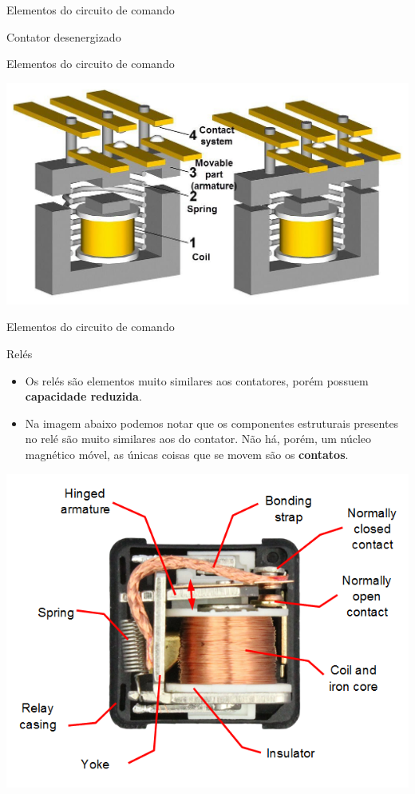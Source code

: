 \begin{frame}{Elementos do circuito de comando}
\begin{minipage}{0.45\linewidth}
	Contator desenergizado
\end{minipage}


\end{frame}

\begin{frame}{Elementos do circuito de comando}
	\centerline{\includegraphics[width=1\linewidth]{Figuras/Ch06/fig10.jpg}}
\end{frame}


\begin{frame}{Elementos do circuito de comando}
\begin{block}{Relés}
\begin{itemize}
    \item Os relés são elementos muito similares aos contatores, porém possuem \textbf{capacidade reduzida}.
    \item Na imagem abaixo podemos notar que os componentes estruturais presentes no relé são muito similares aos do contator. Não há, porém, um núcleo magnético móvel, as únicas coisas que se movem são os \textbf{contatos}.
\end{itemize}
\end{block}
\centerline{\includegraphics[width=0.45\linewidth]{Figuras/Ch06/fig11.png}}
\end{frame}


